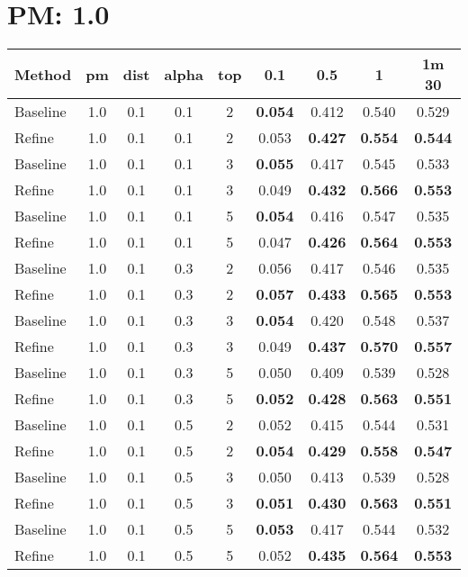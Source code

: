 \documentclass{article}
\begin{document}
\section*{PM: 1.0}
\begin{tabular}{lcccccccc}
\hline
Method & pm & dist & alpha & top & 0.1 & 0.5 & 1 & 1m 30 \\
\hline
Baseline & 1.0 & 0.1 & 0.1 & 2 & \textbf{0.054} & 0.412 & 0.540 & 0.529 \\
Refine   & 1.0 & 0.1 & 0.1 & 2 & 0.053 & \textbf{0.427} & \textbf{0.554} & \textbf{0.544} \\
\hline
Baseline & 1.0 & 0.1 & 0.1 & 3 & \textbf{0.055} & 0.417 & 0.545 & 0.533 \\
Refine   & 1.0 & 0.1 & 0.1 & 3 & 0.049 & \textbf{0.432} & \textbf{0.566} & \textbf{0.553} \\
\hline
Baseline & 1.0 & 0.1 & 0.1 & 5 & \textbf{0.054} & 0.416 & 0.547 & 0.535 \\
Refine   & 1.0 & 0.1 & 0.1 & 5 & 0.047 & \textbf{0.426} & \textbf{0.564} & \textbf{0.553} \\
\hline
Baseline & 1.0 & 0.1 & 0.3 & 2 & 0.056 & 0.417 & 0.546 & 0.535 \\
Refine   & 1.0 & 0.1 & 0.3 & 2 & \textbf{0.057} & \textbf{0.433} & \textbf{0.565} & \textbf{0.553} \\
\hline
Baseline & 1.0 & 0.1 & 0.3 & 3 & \textbf{0.054} & 0.420 & 0.548 & 0.537 \\
Refine   & 1.0 & 0.1 & 0.3 & 3 & 0.049 & \textbf{0.437} & \textbf{0.570} & \textbf{0.557} \\
\hline
Baseline & 1.0 & 0.1 & 0.3 & 5 & 0.050 & 0.409 & 0.539 & 0.528 \\
Refine   & 1.0 & 0.1 & 0.3 & 5 & \textbf{0.052} & \textbf{0.428} & \textbf{0.563} & \textbf{0.551} \\
\hline
Baseline & 1.0 & 0.1 & 0.5 & 2 & 0.052 & 0.415 & 0.544 & 0.531 \\
Refine   & 1.0 & 0.1 & 0.5 & 2 & \textbf{0.054} & \textbf{0.429} & \textbf{0.558} & \textbf{0.547} \\
\hline
Baseline & 1.0 & 0.1 & 0.5 & 3 & 0.050 & 0.413 & 0.539 & 0.528 \\
Refine   & 1.0 & 0.1 & 0.5 & 3 & \textbf{0.051} & \textbf{0.430} & \textbf{0.563} & \textbf{0.551} \\
\hline
Baseline & 1.0 & 0.1 & 0.5 & 5 & \textbf{0.053} & 0.417 & 0.544 & 0.532 \\
Refine   & 1.0 & 0.1 & 0.5 & 5 & 0.052 & \textbf{0.435} & \textbf{0.564} & \textbf{0.553} \\

\end{tabular}
\end{document}
